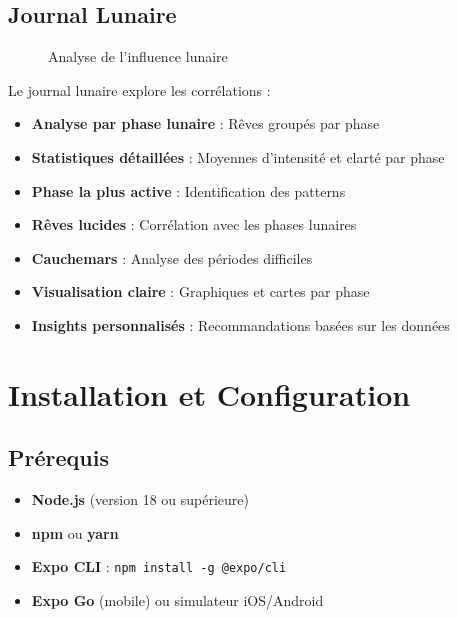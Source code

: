 \documentclass[12pt,a4paper]{article}
\begin{document}
\subsection{Journal Lunaire}

\begin{figure}[H]
    \centering
    \caption{Analyse de l'influence lunaire}
\end{figure}

Le journal lunaire explore les corrélations :

\begin{itemize}
    \item \textbf{Analyse par phase lunaire} : Rêves groupés par phase
    \item \textbf{Statistiques détaillées} : Moyennes d'intensité et clarté par phase
    \item \textbf{Phase la plus active} : Identification des patterns
    \item \textbf{Rêves lucides} : Corrélation avec les phases lunaires
    \item \textbf{Cauchemars} : Analyse des périodes difficiles
    \item \textbf{Visualisation claire} : Graphiques et cartes par phase
    \item \textbf{Insights personnalisés} : Recommandations basées sur les données
\end{itemize}

\section{Installation et Configuration}

\subsection{Prérequis}

\begin{itemize}
    \item \textbf{Node.js} (version 18 ou supérieure)
    \item \textbf{npm} ou \textbf{yarn}
    \item \textbf{Expo CLI} : \texttt{npm install -g @expo/cli}
    \item \textbf{Expo Go} (mobile) ou simulateur iOS/Android
\end{itemize}
\end{document}
